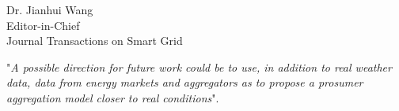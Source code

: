 \documentclass{letter}
\begin{document}
\begin{letter}{Dr. Jianhui Wang \\ Editor-in-Chief \\ Journal Transactions on Smart Grid }
\begin{itemize}
\begin{itemize}
		"\textit{A possible direction for future work could be to use, in addition to real weather data, data from energy markets and aggregators as to propose a prosumer aggregation model closer to real conditions}".
		

	\end{itemize}
	
\end{itemize}



\end{letter}
\end{document}
